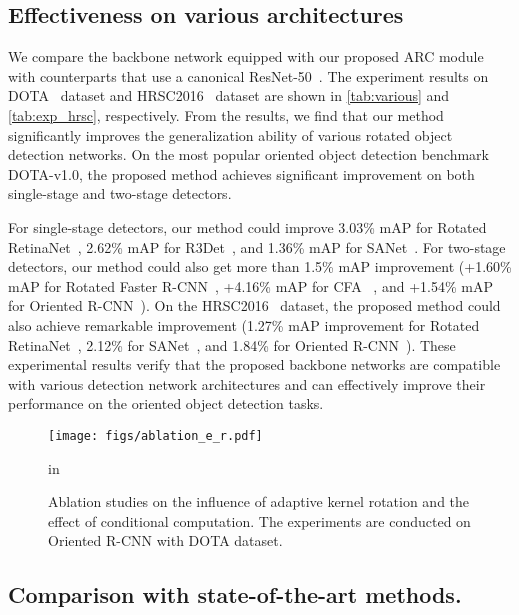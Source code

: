 \subsection{Effectiveness on various architectures}
\label{sec:exp_various}

We compare the backbone network equipped with our proposed ARC module with counterparts that use a canonical ResNet-50~\cite{he2016deep}. The experiment results on DOTA~\cite{xia2018dota} dataset and HRSC2016~\cite{liu2016ship} dataset are shown in \cref{tab:various} and \cref{tab:exp_hrsc}, respectively. From the results, we find that our method significantly improves the generalization ability of various rotated object detection networks. On the most popular oriented object detection benchmark DOTA-v1.0, the proposed method achieves significant improvement on both single-stage and two-stage detectors. 

For single-stage detectors, our method could improve 3.03\% mAP for Rotated RetinaNet~\cite{lin2017focal}, 2.62\% mAP for R3Det~\cite{yang2021r3det}, and 1.36\% mAP for SANet~\cite{han2021align}. For two-stage detectors, our method could also get more than 1.5\% mAP improvement (+1.60\% mAP for Rotated Faster R-CNN~\cite{ren2015faster}, +4.16\% mAP for CFA~\cite{guo2021beyond}
, and +1.54\% mAP for Oriented R-CNN~\cite{xie2021oriented}). On the HRSC2016~\cite{liu2016ship} dataset, the proposed method could also achieve remarkable improvement (1.27\% mAP improvement for  Rotated RetinaNet~\cite{lin2017focal}, 2.12\% for SANet~\cite{han2021align}, and 1.84\% for Oriented R-CNN~\cite{xie2021oriented}). These experimental results verify that the proposed backbone networks are compatible with various detection network architectures and can effectively improve their performance on the oriented object detection tasks.




\begin{figure}[!t]
  \centering
  \texttt{[image: figs/ablation\_e\_r.pdf]}
  \caption{Ablation studies on the influence of adaptive kernel rotation and the effect of conditional computation. The experiments are conducted on Oriented R-CNN with DOTA dataset. }
  \label{fig:abl_rotate_experts}
   in
\end{figure}



\subsection{Comparison with state-of-the-art methods.}
\label{sec:exp_sota}

